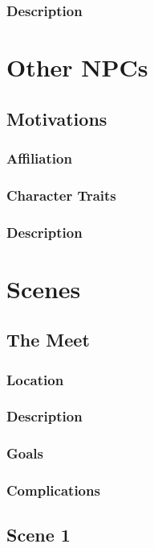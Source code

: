\documentclass{ShadowTeXSR5}
\begin{document}
\subsubsection{Description}
\lipsum[1]

\section{Other NPCs}
\lipsum[1]
\subsection{Motivations}
\lipsum[1]
\subsubsection{Affiliation}
\lipsum[1]
\subsubsection{Character Traits}
\lipsum[1]
\subsubsection{Description}
\lipsum[1]

\section{Scenes}
\lipsum[1]
\subsection{The Meet}
\lipsum[1]
\subsubsection{Location}
\lipsum[1]
\subsubsection{Description}
\lipsum[1]
\subsubsection{Goals}
\lipsum[1]
\subsubsection{Complications}
\lipsum[1]

\subsection{Scene 1}
\lipsum[1]
\end{document}
